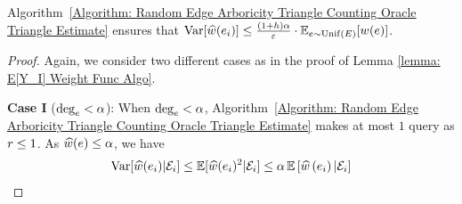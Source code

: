 \begin{lemma}\label{lemma: Var[Y_i] Weight Func Algo}
    Algorithm~\ref{Algorithm: Random Edge Arboricity Triangle Counting Oracle Triangle Estimate} ensures that $\operatorname*{\mathrm{Var}}[\widehat{w}(e_i)] \leq \frac{(1+h)\alpha}{\varepsilon} \cdot \operatorname*{\mathbb{E}}_{e \sim \mathrm{Unif}\left({E}\right)}[w(e)]$.
    \begin{proof}
        Again, we consider two different cases as in the proof of Lemma \ref{lemma: E[Y_I] Weight Func Algo}.  
        
      
      {\bf Case I }($\mbox{deg}_{e} < \alpha$):
        When $\mbox{deg}_{e} < \alpha$, Algorithm~\ref{Algorithm: Random Edge Arboricity Triangle Counting Oracle Triangle Estimate} makes at most $1$ query as $r \leq 1$. As $\widehat{w}(e) \leq \alpha$, we have 
        \begin{align}
            \operatorname*{\mathrm{Var}}[\widehat{w}(e_i)|\mathcal{E}_i] \leq \operatorname*{\mathbb{E}}[\widehat{w}(e_i)^2|\mathcal{E}_i] \leq \alpha\operatorname*{\mathbb{E}}\left[{\widehat{w}\left({e_i}\right)|\mathcal{E}_i}\right] \label{Eq: Var[Y_i,S, Small Degree Edge] random edge arboricity}
        \end{align}
        
        

\end{proof}
\end{lemma}
